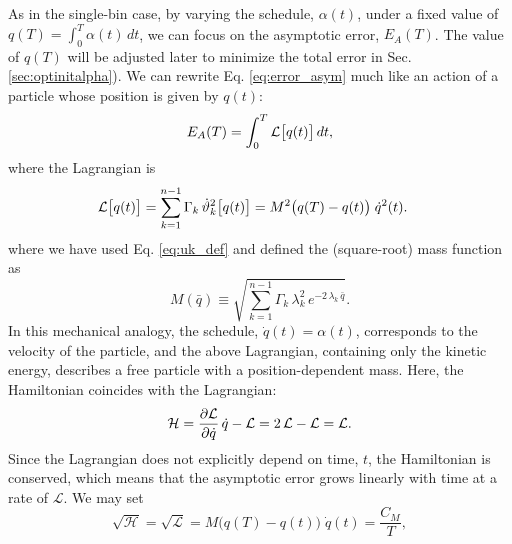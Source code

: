 \documentclass[preprint, superscriptaddress, floatfix]{revtex4-1}
\newcommand{\Err}{E}
\begin{document}
As in the single-bin case,
by varying the schedule, $\alpha(t)$, under a fixed value of
$q(T) = \int_0^T \alpha(t) \, dt$,
we can focus on the asymptotic error,
$\Err_A(T)$.
%
The value of $q(T)$ will be adjusted later
to minimize the total error in Sec. \ref{sec:optinitalpha}).
%
We can rewrite Eq. \eqref{eq:error_asym} much like an action
of a particle whose position is given by $q(t)$:
%
\begin{equation}
  \Err_A(T)
  =
  \int_0^T
    {\mathcal L} \bigl[ q(t)\bigr]
    \, dt
  ,
  \notag
\end{equation}
%
where the Lagrangian is
%
\begin{align}
  {\mathcal L} \bigl[ q(t) \bigr]
  &=
  \sum_{ k = 1 }^{n - 1}
    \Gamma_k \, {\dot \vartheta}_k^2\bigl[ q(t) \bigr]
  =
  M^2\bigl(q(T) - q(t) \bigr)
  \; \dot q^2( t )
  .
\notag
\end{align}
%
where we have
used Eq. \eqref{eq:uk_def} and
defined the (square-root) mass function as
%
\begin{equation}
  M(\bar q)
  \equiv
  \sqrt{
    \textstyle\sum_{ k = 1 }^{n - 1}
    \Gamma_k \, \lambda_k^2 \, e^{-2 \, \lambda_k \, \bar q}
  }
  .
  \label{eq:mass_func}
\end{equation}
%
In this mechanical analogy,
the schedule, $\dot q(t) = \alpha(t)$,
corresponds to the velocity of the particle,
%
and the above Lagrangian, containing only the kinetic energy,
describes a free particle
with a position-dependent mass.
%
Here, the Hamiltonian coincides with the Lagrangian:
%
\begin{equation}
  \mathcal H
  =
  \frac{ \partial \mathcal L }
       { \partial \dot q     }
  \, \dot q
  -
  \mathcal L
  =
  2 \, \mathcal L
  - \mathcal L
  =
  \mathcal L
  .
  \notag
\end{equation}
%
Since the Lagrangian
does not explicitly depend on time, $t$,
the Hamiltonian is conserved,\cite{goldstein, *landau_mechanics, *arnold}
which means that the asymptotic error grows
linearly with time at a rate of $\mathcal L$.
We may set
%
\begin{equation}
  \sqrt{ \mathcal H }
  =
  \sqrt{ \mathcal L }
  =
  M\bigl( q(T) - q(t) \bigr)
  \;
  \dot q(t)
  =
  \frac{C_M}{T}
  ,
  \label{eq:Lagrangian_const}
\end{equation}
\end{document}
